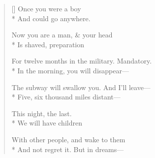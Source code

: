 \label{ch:milano_last_day}
\settowidth{\versewidth}{For twelve months in the military.   Mandatory.}
\begin{verse}[\versewidth]
Once you were a boy\\*
And could go anywhere.

Now you are a man, \& your head\\*
Is shaved, preparation

For twelve months in the military.   Mandatory.\\*
In the morning, you will disappear---

The subway will swallow you.   And I'll leave---\\*
Five, six thousand miles distant---

This night, the last.\\*
We will have children

With other people, and wake to them\\*
And not regret it.     But in dreams---
\end{verse}
